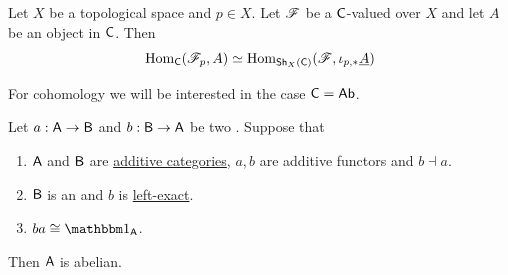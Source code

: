\documentclass[../main.tex]{subfiles}
\begin{document}
\begin{corollary}\label{cor:stalk-constant-adjunction-presheaf}
  Let \(X\) be a topological space and \(p \in X\).
  Let \(\mathscr{F}\) be a \(\mathsf{C}\)-valued  over \(X\) and let \(A\) be an object in \(\mathsf{C}\).
  Then
  \begin{equation*}
    \operatorname{Hom}_{\mathsf{C}}(\mathscr{F}_{p}, A) \simeq \operatorname{Hom}_{\mathsf{Sh}_{X}(\mathsf{C})}(\mathscr{F}, \iota_{p, \ast}\underline{A})
  \end{equation*}
\end{corollary}


For cohomology we will be interested in the case \(\mathsf{C} = \mathsf{Ab}\).

\begin{lemma} \label{lemma:abelian-category-from-adjunction}
  Let \(a: \mathsf{A} \to \mathsf{B}\) and \(b: \mathsf{B} \to \mathsf{A}\) be two .
  Suppose that
  \begin{enumerate}
    \item \(\mathsf{A}\) and \(\mathsf{B}\) are \hyperref[def:additive-category]{additive categories}, \(a, b\) are additive functors and \(b \dashv a\).
    \item \(\mathsf{B}\) is an  and \(b\) is \hyperref[def:exact-complex-functor]{left-exact}.
    \item \(ba \cong \id_{\category{A}}\).
  \end{enumerate}
  Then \(\mathsf{A}\) is abelian.
\end{lemma}
\end{document}

